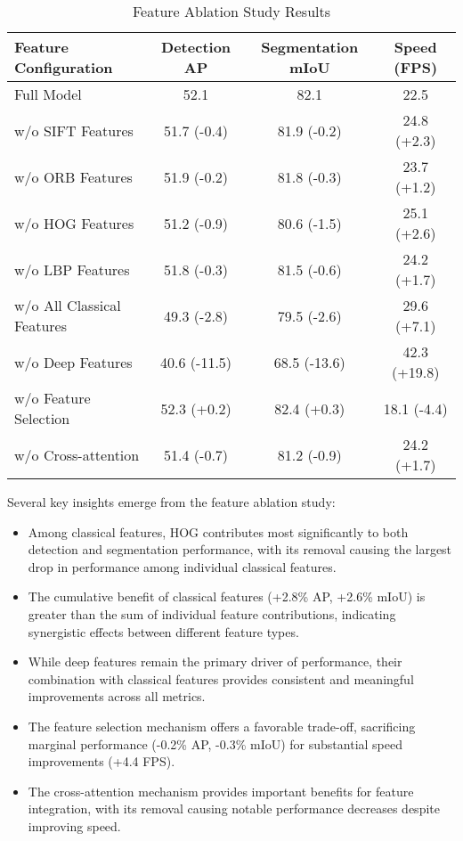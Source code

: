 \begin{table}[h]
\centering
\caption{Feature Ablation Study Results}
\label{tab:feature_ablation}
\begin{tabular}{lccc}
\hline
\textbf{Feature Configuration} & \textbf{Detection AP} & \textbf{Segmentation mIoU} & \textbf{Speed (FPS)} \\
\hline
Full Model & 52.1 & 82.1 & 22.5 \\
\hline
w/o SIFT Features & 51.7 (-0.4) & 81.9 (-0.2) & 24.8 (+2.3) \\
w/o ORB Features & 51.9 (-0.2) & 81.8 (-0.3) & 23.7 (+1.2) \\
w/o HOG Features & 51.2 (-0.9) & 80.6 (-1.5) & 25.1 (+2.6) \\
w/o LBP Features & 51.8 (-0.3) & 81.5 (-0.6) & 24.2 (+1.7) \\
\hline
w/o All Classical Features & 49.3 (-2.8) & 79.5 (-2.6) & 29.6 (+7.1) \\
w/o Deep Features & 40.6 (-11.5) & 68.5 (-13.6) & 42.3 (+19.8) \\
\hline
w/o Feature Selection & 52.3 (+0.2) & 82.4 (+0.3) & 18.1 (-4.4) \\
w/o Cross-attention & 51.4 (-0.7) & 81.2 (-0.9) & 24.2 (+1.7) \\
\hline
\end{tabular}
\end{table}

Several key insights emerge from the feature ablation study:

\begin{itemize}
    \item Among classical features, HOG contributes most significantly to both detection and segmentation performance, with its removal causing the largest drop in performance among individual classical features.
    
    \item The cumulative benefit of classical features (+2.8\% AP, +2.6\% mIoU) is greater than the sum of individual feature contributions, indicating synergistic effects between different feature types.
    
    \item While deep features remain the primary driver of performance, their combination with classical features provides consistent and meaningful improvements across all metrics.
    
    \item The feature selection mechanism offers a favorable trade-off, sacrificing marginal performance (-0.2\% AP, -0.3\% mIoU) for substantial speed improvements (+4.4 FPS).
    
    \item The cross-attention mechanism provides important benefits for feature integration, with its removal causing notable performance decreases despite improving speed.
\end{itemize}

